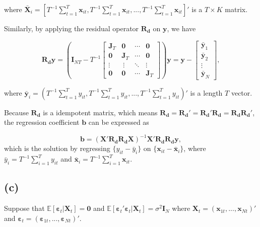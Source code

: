 \documentclass[
]{article}
\begin{document}
where
\(\bar{\boldsymbol{X}}_i = [T^{-1}\sum_{t=1}^{T}\boldsymbol{x}_{it}, T^{-1}\sum_{t=1}^{T}\boldsymbol{x}_{it}, ..., T^{-1}\sum_{t=1}^{T}\boldsymbol{x}_{it}]'\)
is a \(T \times K\) matrix.

Similarly, by applying the residual operator \(\boldsymbol{R_d}\) on
\(\boldsymbol{y}\), we have

\[\boldsymbol{R_dy} = \left(\boldsymbol{I}_{NT} - T^{-1}\begin{bmatrix}\boldsymbol{J}_T & \boldsymbol{0} & \cdots & \boldsymbol{0} \\ \boldsymbol{0} & \boldsymbol{J}_T & \cdots & \boldsymbol{0} \\ \vdots &\ \vdots & \ddots & \vdots \\ \boldsymbol{0} & \boldsymbol{0} & \cdots & \boldsymbol{J}_T\end{bmatrix}\right)\boldsymbol{y} = \boldsymbol{y}-\begin{bmatrix}\bar{\boldsymbol{y}}_1 \\ \bar{\boldsymbol{y}}_2 \\  \vdots \\ \bar{\boldsymbol{y}}_N \end{bmatrix},\]

where
\(\bar{\boldsymbol{y}}_i=(T^{-1}\sum_{t=1}^{T}y_{it}, T^{-1}\sum_{t=1}^{T}y_{it}, ..., T^{-1}\sum_{t=1}^{T}y_{it})'\)
is a length \(T\) vector.

Because \(\boldsymbol{R_d}\) is a idempotent matrix, which means
\(\boldsymbol{R_d} = \boldsymbol{R_d}' = \boldsymbol{R_d}'\boldsymbol{R_d} = \boldsymbol{R_d}\boldsymbol{R_d}'\),
the regression coefficient \(\boldsymbol{b}\) can be expressed as

\[\boldsymbol{b} = (\boldsymbol{X'R_dR_dX})^{-1}\boldsymbol{X'R_dR_dy},\]
which is the solution by regressing \(\{y_{it}-\bar{y}_i\}\) on
\(\{\boldsymbol{x}_{it}-\bar{\boldsymbol{x}}_i\}\), where
\(\bar{y}_i = T^{-1}\sum_{i=1}^{T}y_{it}\) and
\(\bar{\boldsymbol{x}}_{i} = T^{-1}\sum_{i=1}^{T}\boldsymbol{x}_{it}\).

\hypertarget{c}{%
\subsection{(c)}\label{c}}

Suppose that
\(\mathbb{E}[\boldsymbol{\varepsilon}_t|\boldsymbol{X}_t] = \boldsymbol{0}\)
and
\(\mathbb{E}[\boldsymbol{\varepsilon}_t'\boldsymbol{\varepsilon}_t|\boldsymbol{X}_t]=\sigma^2\boldsymbol{I}_N\)
where
\(\boldsymbol{X}_t = (\boldsymbol{x}_{1t},...,\boldsymbol{x}_{Nt})'\)
and
\(\boldsymbol{\varepsilon}_t = (\boldsymbol{\varepsilon}_{1t},...,\boldsymbol{\varepsilon}_{Nt})'\).
\end{document}
